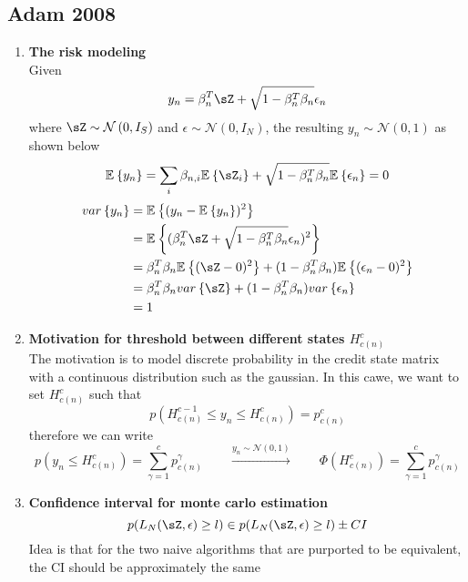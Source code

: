 \documentclass[11pt]{article}
\begin{document}
\renewcommand{\norm}[1]{\left\lVert#1\right\rVert}
\newcommand{\abs}[1]{\left|#1\right|}
\renewcommand{\E}[2][]{\mathbb{E}_{#1}\left\{#2\right\}}
\renewcommand{\var}[2][]{var_{#1}\left\{#2\right\}}
\renewcommand{\cov}[1]{cov\{#1\}} 
\newcommand{\normal}[1]{\mathcal{N}\left(#1\right)}
\newcommand{\exponents}[1]{exp\left\{#1\right\}}
\newcommand{\indicator}[1]{\mathbbm{1}_{#1}}

\renewcommand{\bmu}{\boldsymbol{\mu}}
\renewcommand{\bpi}{\boldsymbol{\pi}}
\newcommand{\bTheta}{\boldsymbol{\Theta}}
\newcommand{\bSigma}{\boldsymbol{\Sigma}}
\renewcommand{\bphi}{\boldsymbol{\phi}}

\subsection*{Adam 2008}

\begin{enumerate}
    \item \textbf{The risk modeling} \\
    Given 
    \[
        y_n = \beta_n^T \sZ + \sqrt{1 - \beta_n^T \beta_n} \epsilon_n
    \]
    where $\sZ \sim \normal{0, I_S}$ and $\epsilon \sim \normal{0, I_N}$, the resulting $y_n \sim \normal{0,1}$ as shown below 
    \[
        \E{y_n} = \sum_{i} \beta_{n,i} \E{\sZ_i} + \sqrt{1 - \beta_n^T \beta_n} \E{\epsilon_n} = 0
    \]
    \begin{align*}
        \var{y_n} 
        &= \E{(y_n - \E{y_n})^2} \\
        &= \E{ (\beta_n^T \sZ + \sqrt{1 - \beta_n^T \beta_n} \epsilon_n)^2 }\\
        &= \beta_n^T \beta_n \E{(\sZ - 0)^2} + (1-\beta_n^T \beta_n) \E{(\epsilon_n - 0)^2} \\
        &= \beta_n^T \beta_n \var{\sZ} + (1-\beta_n^T \beta_n) \var{\epsilon_n} \\
        &= 1
    \end{align*}
    \item \textbf{Motivation for threshold between different states $H_{c(n)}^c$} \\
    The motivation is to model discrete probability in the credit state matrix with a continuous distribution such as the gaussian. In this cawe, we want to set $H_{c(n)}^c$ such that
    \[
        p(H_{c(n)}^{c-1}\leq y_n \leq H_{c(n)}^c) = p_{c(n)}^c
    \]
    therefore we can write 
    \[
        p(y_n \leq H_{c(n)}^c) = \sum_{\gamma = 1}^c p_{c(n)}^{\gamma}
        \qquad 
        \overset{y_n \sim \normal{0,1}}{\longrightarrow} 
        \qquad 
        \Phi(H_{c(n)}^c) = \sum_{\gamma = 1}^c p_{c(n)}^{\gamma}
    \]
    \item \textbf{Confidence interval for monte carlo estimation}
    \[
        p(L_N(\sZ, \epsilon)\geq l) \in 
        p(L_N(\sZ, \epsilon)\geq l) \pm CI
    \]
    Idea is that for the two naive algorithms that are purported to be equivalent, the CI should be approximately the same
\end{enumerate}
\end{document}
